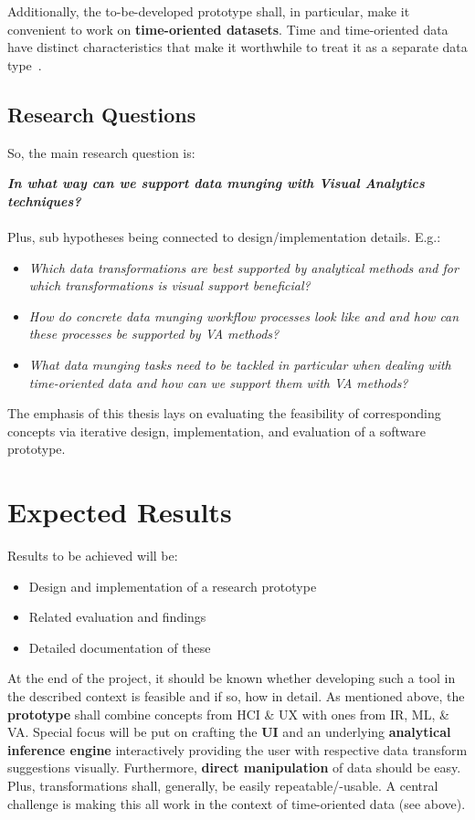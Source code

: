 Additionally, the to-be-developed prototype shall, in particular, make it convenient to work on \textbf{time-oriented datasets}. Time and time-oriented data have distinct characteristics that make it worthwhile to treat it as a separate data type~\cite{Aigner2011}.

\subsection{Research Questions}

So, the main research question is:

\textbf{\textit{In what way can we support data munging with Visual Analytics techniques?}}
\\\\
Plus, sub hypotheses being connected to design/implementation details. E.g.:

\begin{itemize}
  \item \textit{Which data transformations are best supported by analytical methods and for which transformations is visual support beneficial?}
  \item \textit{How do concrete data munging workflow processes look like and and how can these processes be supported by VA methods?}
  \item \textit{What data munging tasks need to be tackled in particular when dealing with time-oriented data and how can we support them with VA methods?}
\end{itemize}

The emphasis of this thesis lays on evaluating the feasibility of corresponding concepts via iterative design, implementation, and evaluation of a software prototype.


\section{Expected Results}

Results to be achieved will be:

\begin{itemize}
  \item Design and implementation of a research prototype
  \item Related evaluation and findings
  \item Detailed documentation of these
\end{itemize}

At the end of the project, it should be known whether developing such a tool in the described context is feasible and if so, how in detail. As mentioned above, the \textbf{prototype} shall combine concepts from HCI \& UX with ones from IR, ML, \& VA. Special focus will be put on crafting the \textbf{UI} and an underlying \textbf{analytical inference engine} interactively providing the user with respective data transform suggestions visually. Furthermore, \textbf{direct manipulation} of data should be easy. Plus, transformations shall, generally, be easily repeatable/-usable. A central challenge is making this all work in the context of time-oriented data (see above).

